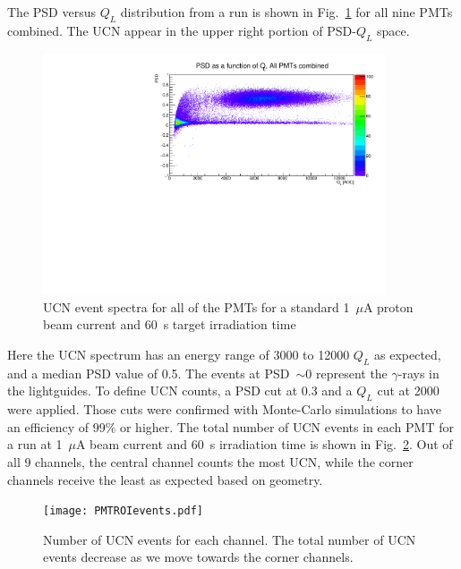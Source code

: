 The PSD versus $Q_L$ distribution from a run is shown in
Fig.~\ref{fig:psd_vs_ql} for all nine PMTs combined. The UCN appear in
the upper right portion of PSD-$Q_L$ space.
\begin{figure}[h!]
  \centering
  \includegraphics[width=0.9\textwidth]{PSD_vs_QL.pdf}
  \caption[UCN event spectra for 1~$\mu$A beam current and 60~s target
  irradiation]{UCN event spectra for all of the PMTs for a standard
    1~$\mu$A proton beam current and 60~s target irradiation time }
  \label{fig:psd_vs_ql}
\end{figure}

Here the UCN spectrum has an energy range of 3000 to 12000 $Q_L$ as
expected, and a median PSD value of 0.5. The events at PSD~$\sim 0$
represent the $\gamma$-rays in the lightguides. To define UCN counts,
a PSD cut at 0.3 and a $Q_L$ cut at 2000 were applied. Those cuts were
confirmed with Monte-Carlo simulations to have an efficiency of 99\%
or higher. The total number of UCN events in each PMT for a run at
1~$\mu$A beam current and 60~s irradiation time is shown in
Fig.~\ref{fig:channelcounts}.  Out of all 9 channels, the central
channel counts the most UCN, while the corner channels receive the
least as expected based on geometry.
\begin{figure}[h!]
  \centering \texttt{[image: PMTROIevents.pdf]}
  \caption[UCN events per channel]{Number of UCN events for each
    channel. The total number of UCN events decrease as we move
    towards the corner channels.  }
  \label{fig:channelcounts}
\end{figure}


